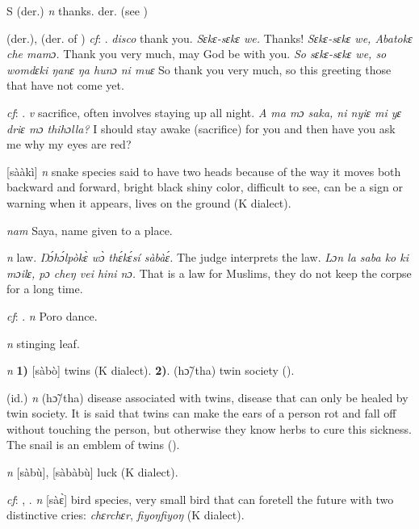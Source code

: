 \begin{letter}{S}
 (der.) \textit{n} thanks. der.  (see )

 (der.), (der. of ) \textit{cf}: . \textit{disco} thank you. \textit{Sɛkɛ-sɛkɛ we.} Thanks! \textit{Sɛkɛ-sɛkɛ we, Abatokɛ che mamɔ.} Thank you very much, may God be with you. \textit{So sɛkɛ-sɛkɛ we, so womdɛki ŋanɛ ŋa hunɔ ni muɛ} So thank you very much, so this greeting those that have not come yet.

 \textit{cf}: . \textit{v} sacrifice, often involves staying up all night. \textit{A ma mɔ saka, ni nyiɛ mi yɛ driɛ mɔ thihɔlla?} I should stay awake (sacrifice) for you and then have you ask me why my eyes are red?

 [sààkì] \textit{n} snake species said to have two heads because of the way it moves both backward and forward, bright black shiny color, difficult to see, can be a sign or warning when it appears, lives on the ground (K dialect).

 \textit{nam} Saya, name given to a place. 

 \textit{n} law. \textit{Ŋɔ́hɔ́lpòkɛ̀ wɔ̀ thɛ́kɛ́sí sàbàɛ́.} The judge interprets the law. \textit{Lɔn la saba ko ki mɔilɛ, pɔ cheŋ vei hini nɔ.} That is a law for Muslims, they do not keep the corpse for a long time.

 \textit{cf}: . \textit{n} Poro dance.

 \textit{n} stinging leaf.

 \textit{n} \textbf{1)} [sàbò] twins (K dialect). \textbf{2)}. (hɔ̃/tha) twin society (\citealt{Pichl1967}).

 (id.) \textit{n} (hɔ̃/tha) disease associated with twins, disease that can only be healed by twin society. It is said that twins can make the ears of a person rot and fall off without touching the person, but otherwise they know herbs to cure this sickness. The snail is an emblem of twins (\citealt{Pichl1967}).

 \textit{n} [sàbù], [sàbàbù] luck (K dialect). 

 \textit{cf}: , . \textit{n} [sàɛ̀] bird species, very small bird that can foretell the future with two distinctive cries: \textit{chɛrchɛr}, \textit{fiyoŋfiyoŋ} (K dialect). 


\end{letter}
